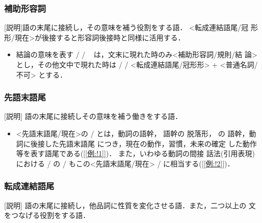 \subsubsection{補助形容詞}
[説明]語の末尾に接続し，その意味を補う役割をする語．
<転成連結語尾/冠
形形/現在>が後接すると形容詞後接時と同様に活用する．

\begin{itemize}
\item 
結論の意味を表す
/
/
\ 
は，文末に現れた時のみ<補助形容詞/規則/結
論>とし，その他文中で現れた時は 
/
/
 <転成連結語尾/冠形形> + 
 <普通名詞/不可> とする．
\end{itemize}

\subsubsection{先語末語尾}        
[説明] 語の末尾に接続しその意味を補う働きをする語．

\begin{itemize}        
\item 
<先語末語尾/現在>の 
/
とは，動詞の語幹，
語幹の
脱落形，
 の
語幹，動詞に後接した先語末語尾 
につき，現在の動作，習慣，未来の確定
した動作 等を表す語尾である([\ref{例:!1}])． また，いわゆる動詞の間接
話法(引用表現)における 
/
 の 
/
 もこの<先語末語尾/現在>
/
 に相当する([\ref{例:!2}])．


\end{itemize}

        
\subsubsection{転成連結語尾}        
[説明] 語の末尾に接続し，他品詞に性質を変化させる語．また，二つ以上の
文をつなげる役割をする語．

